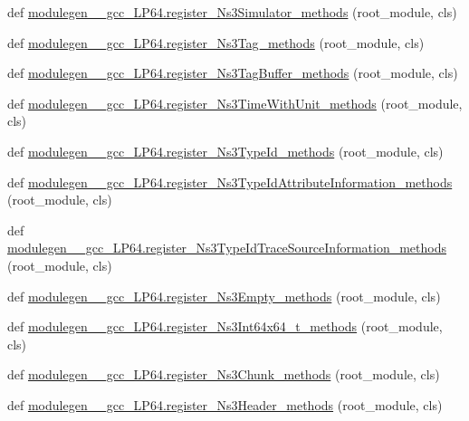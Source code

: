 \begin{DoxyCompactItemize}
def \hyperlink{namespacemodulegen____gcc__LP64_ac43918825b198877acafaae4cbc1c9e0}{modulegen\+\_\+\+\_\+gcc\+\_\+\+L\+P64.\+register\+\_\+\+Ns3\+Simulator\+\_\+methods} (root\+\_\+module, cls)
\item 
def \hyperlink{namespacemodulegen____gcc__LP64_a8667a8c9dd38f2a77c66b6851250f1cb}{modulegen\+\_\+\+\_\+gcc\+\_\+\+L\+P64.\+register\+\_\+\+Ns3\+Tag\+\_\+methods} (root\+\_\+module, cls)
\item 
def \hyperlink{namespacemodulegen____gcc__LP64_a77191b364d09e6ccbe9b803bee493b0a}{modulegen\+\_\+\+\_\+gcc\+\_\+\+L\+P64.\+register\+\_\+\+Ns3\+Tag\+Buffer\+\_\+methods} (root\+\_\+module, cls)
\item 
def \hyperlink{namespacemodulegen____gcc__LP64_a054aa04457970b1c07a67d49cafee187}{modulegen\+\_\+\+\_\+gcc\+\_\+\+L\+P64.\+register\+\_\+\+Ns3\+Time\+With\+Unit\+\_\+methods} (root\+\_\+module, cls)
\item 
def \hyperlink{namespacemodulegen____gcc__LP64_adea84ddbc489895d2347d15ea1328bc0}{modulegen\+\_\+\+\_\+gcc\+\_\+\+L\+P64.\+register\+\_\+\+Ns3\+Type\+Id\+\_\+methods} (root\+\_\+module, cls)
\item 
def \hyperlink{namespacemodulegen____gcc__LP64_aae2764584a69687644f37b42586364df}{modulegen\+\_\+\+\_\+gcc\+\_\+\+L\+P64.\+register\+\_\+\+Ns3\+Type\+Id\+Attribute\+Information\+\_\+methods} (root\+\_\+module, cls)
\item 
def \hyperlink{namespacemodulegen____gcc__LP64_af7ee3e03193815233627c2c4b4b2ebf6}{modulegen\+\_\+\+\_\+gcc\+\_\+\+L\+P64.\+register\+\_\+\+Ns3\+Type\+Id\+Trace\+Source\+Information\+\_\+methods} (root\+\_\+module, cls)
\item 
def \hyperlink{namespacemodulegen____gcc__LP64_af245edb84966d4b4c48221a31647be89}{modulegen\+\_\+\+\_\+gcc\+\_\+\+L\+P64.\+register\+\_\+\+Ns3\+Empty\+\_\+methods} (root\+\_\+module, cls)
\item 
def \hyperlink{namespacemodulegen____gcc__LP64_a1239c8a15c3a5d5ac5184bd53add8029}{modulegen\+\_\+\+\_\+gcc\+\_\+\+L\+P64.\+register\+\_\+\+Ns3\+Int64x64\+\_\+t\+\_\+methods} (root\+\_\+module, cls)
\item 
def \hyperlink{namespacemodulegen____gcc__LP64_ad963bb0d3bc0910b7d8b5a1818803799}{modulegen\+\_\+\+\_\+gcc\+\_\+\+L\+P64.\+register\+\_\+\+Ns3\+Chunk\+\_\+methods} (root\+\_\+module, cls)
\item 
def \hyperlink{namespacemodulegen____gcc__LP64_a3c6ef29ba074be124c68037155fe7cbe}{modulegen\+\_\+\+\_\+gcc\+\_\+\+L\+P64.\+register\+\_\+\+Ns3\+Header\+\_\+methods} (root\+\_\+module, cls)

\end{DoxyCompactItemize}
